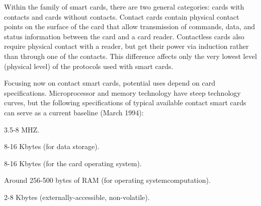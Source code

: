 \begin{htmllist}

  
  Within the family of smart cards, there are two general categories: cards
  with contacts and cards without contacts. Contact cards contain physical
  contact points on the surface of the card that allow transmission of
  commands, data, and status information between the card and a card
  reader. Contactless cards also require physical contact with a reader,
  but get their power via induction rather than through one of the
  contacts. This difference affects only the very lowest level (physical
  level) of the protocols used with smart cards.


  
  Focusing now on contact smart cards, potential uses depend on card
  specifications. Microprocessor and memory technology have steep
  technology curves, but the following specifications of typical available
  contact smart cards can serve as a current baseline (March 1994):


       3.5-8 MHZ.

       8-16
      Kbytes (for data storage).

       8-16 Kbytes (for the card operating
      system).

       Around 256-500 bytes of RAM (for
      operating systemcomputation).

       2-8 Kbytes
      (externally-accessible, non-volatile).


\end{htmllist}
